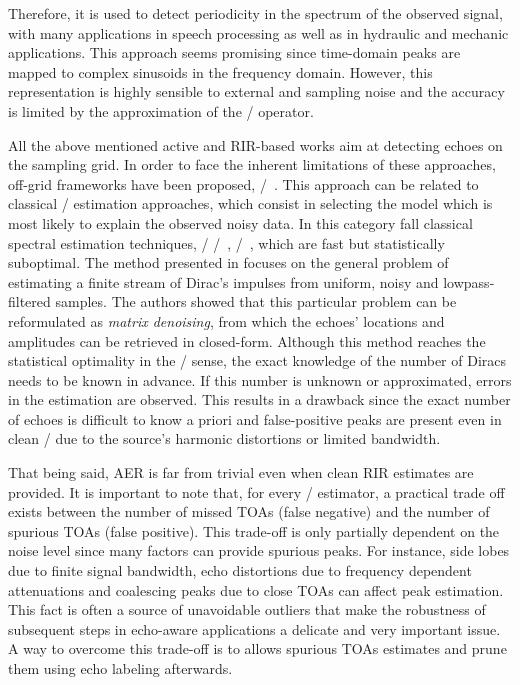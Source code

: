 Therefore, it is used to detect periodicity in the spectrum of the observed signal, with many applications in speech processing as well as in hydraulic and mechanic applications.
This approach seems promising since time-domain peaks are mapped to complex sinusoids in the frequency domain.
However, this representation is highly sensible to external and sampling noise and the accuracy is limited by the approximation of the \DFT/ operator.

\mynewline
All the above mentioned active and \ac{RIR}-based works aim at detecting echoes on the sampling grid.
In order to face the inherent limitations of these approaches, off-grid frameworks have been proposed, \eg/~.
This approach can be related to classical \MLdef/ estimation approaches, which consist in selecting the model which is most likely to explain the observed noisy data.
In this category fall classical spectral estimation techniques, \eg/ \MUSIC/~, \ESPRIT/~, which are fast but statistically suboptimal.
The method presented in  focuses on the general problem of estimating a finite stream of Dirac's impulses from uniform, noisy and lowpass-filtered samples.
The authors showed that this particular problem can be reformulated as \textit{matrix denoising}, from which the echoes' locations and amplitudes can be retrieved in closed-form.
Although this method reaches the statistical optimality in the \ML/ sense, the exact knowledge of the number of Diracs needs to be known in advance.
If this number is unknown or approximated, errors in the estimation are observed.
This results in a drawback since the exact number of echoes is difficult to know a priori and false-positive peaks are present even in clean \RIRs/ due to the source's harmonic distortions or limited bandwidth.

\mynewline
That being said, \ac{AER} is far from trivial even when clean \ac{RIR} estimates are provided.
It is important to note that, for every \TOA/ estimator, a practical trade off exists between the number of missed \acp{TOA} (false negative) and the number of spurious \acp{TOA} (false positive).
This trade-off is only partially dependent on the noise level since many factors can provide spurious peaks.
For instance, side lobes due to finite signal bandwidth, echo distortions due to frequency dependent attenuations and coalescing peaks due to close \acp{TOA} can affect peak estimation.
This fact is often a source of unavoidable outliers that make the robustness of subsequent steps in echo-aware applications a delicate and very important issue.
A way to overcome this trade-off is to allows spurious \acp{TOA} estimates and prune them using echo labeling afterwards.

